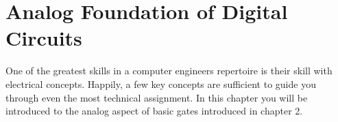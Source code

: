 \chapter{Analog Foundation of Digital Circuits}
\label{chapter:Analog Foundation}
\graphicspath{ {./chapter09/Fig} }

One of the greatest skills in a computer engineers repertoire
is their skill with electrical concepts.  Happily, a few
key concepts are sufficient to guide you
through even the most technical assignment.  In this chapter
you will be introduced to the analog aspect of basic gates
introduced in chapter 2.


